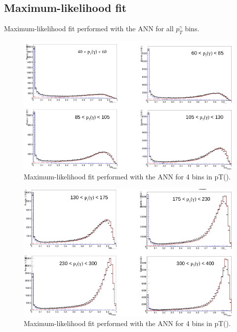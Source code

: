 \documentclass[11pt,a4paper]{report}
\theoremstyle{break}
\begin{document}
\begin{appendix}
    \chapter{Maximum-likelihood fit}

Maximum-likelihood fit performed with the ANN for all $p_T^\gamma$ bins.

\begin{figure}[h!]
\centering
    \includegraphics[width=1\textwidth]{fit_pad1}
    \caption{Maximum-likelihood fit performed with the ANN for 4 bins in pT(\textgamma).}
    \label{pull_pad1}
\end{figure}
\begin{figure}[h!]
\centering
    \includegraphics[width=1\textwidth]{fit_pad2}
    \caption{Maximum-likelihood fit performed with the ANN for 4 bins in pT(\textgamma).}
    \label{pull_pad1}
\end{figure}
\begin{figure}[h!]
\centering

\end{figure}
\end{appendix}
\end{document}
